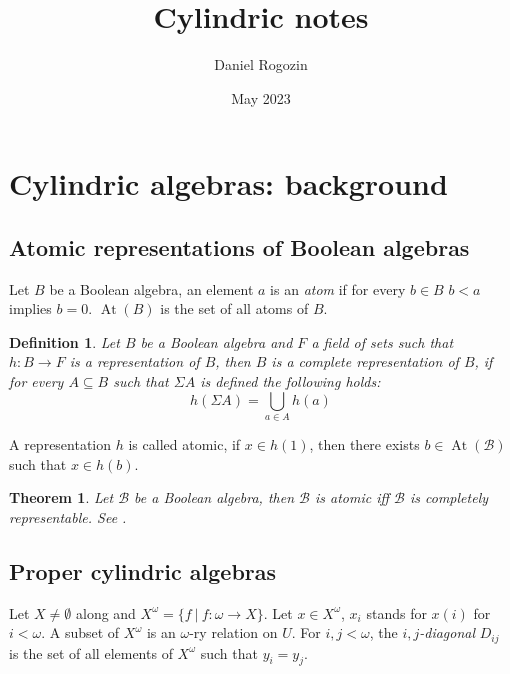\documentclass{article}
\title{Cylindric notes}
\author{Daniel Rogozin}
\date{May 2023}
\theoremstyle{defin}
\newtheorem{definition}{Definition}
\theoremstyle{theorem}
\newtheorem{theorem}{Theorem}
\theoremstyle{claim}
\theoremstyle{prop}
\theoremstyle{lemma}
\theoremstyle{fact}
\theoremstyle{remark}
\theoremstyle{ex}
\theoremstyle{col}
\theoremstyle{question}
\begin{document}
\maketitle

\nocite{*}




\section{Cylindric algebras: background}

\subsection{Atomic representations of Boolean algebras}

Let $B$ be a Boolean algebra, an element $a$ is an \emph{atom} if for every $b \in B$
$b < a$ implies $b = 0$. $\operatorname{At}(B)$ is the set of all atoms
of $B$.

\begin{definition} \label{compeleterep}
Let $B$ be a Boolean algebra and $F$ a field of sets such that $h : B \to F$ is a
representation of $B$, then $B$ is a complete representation of $B$, if for every
$A \subseteq B$ such that $\Sigma A$ is defined the following holds:
\begin{equation}
  h(\Sigma A) = \bigcup \limits_{a \in A} h(a)
\end{equation}
\end{definition}

A representation $h$ is called atomic, if $x \in h(1)$, then there exists $b \in \operatorname{At}(\mathcal{B})$ such that $x \in h(b)$.

\begin{theorem} \label{completeboolean}
  Let $\mathcal{B}$ be a Boolean algebra, then $\mathcal{B}$ is atomic iff $\mathcal{B}$ is completely representable. See \cite[Corollary 6]{hirsch1997complete}.
\end{theorem}

\subsection{Proper cylindric algebras}

Let $X \neq \emptyset$ along and $X^{\omega} = \{ f \: | \: f : \omega \to X \}$.
Let $x \in X^{\omega}$, $x_i$ stands for $x(i)$ for $i < \omega$. A subset of $X^{\omega}$ is an $\omega$-ry relation on $U$. For $i, j < \omega$, the \emph{$i,j$-diagonal} $D_{ij}$ is the set of all elements of $X^{\omega}$ such that $y_i = y_j$.
\end{document}

